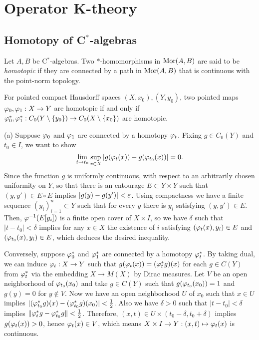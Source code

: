 \documentclass{../../large}
\begin{document}
\chapter{Operator K-theory}


\section{Homotopy of C$^*$-algebras}

\begin{prb}
Let $A,B$ be C$^*$-algebras.
Two $*$-homomorphisms in $\operatorname{Mor}(A,B)$ are said to be \emph{homotopic} if they are connected by a path in $\operatorname{Mor}(A,B)$ that is continuous with the point-norm topology.
\begin{parts}
\item For pointed compact Hausdorff spaces $(X,x_0),(Y,y_0)$, two pointed maps $\varphi_0,\varphi_1:X\to Y$ are homotopic if and only if $\varphi_0^*,\varphi_1^*:C_0(Y\setminus\{y_0\})\to C_0(X\setminus\{x_0\})$ are homotopic.
\end{parts}
\end{prb}
\begin{pf}
(a)
Suppose $\varphi_0$ and $\varphi_1$ are connected by a homotopy $\varphi_t$.
Fixing $g\in C_0(Y)$ and $t_0\in I$, we want to show
\[\lim_{t\to t_0}\sup_{x\in X}|g(\varphi_t(x))-g(\varphi_{t_0}(x))|=0.\]
Since the function $g$ is uniformly continuous, with respect to an arbitrarily chosen uniformity on $Y$, so that there is an entourage $E\subset Y\times Y$ such that $(y,y')\in E\circ E$ implies $|g(y)-g(y')|<\varepsilon$.
Using compactness we have a finite sequence $(y_i)_{i=1}^n\subset Y$ such that for every $y$ there is $y_i$ satisfying $(y,y')\in E$.
Then, $\varphi^{-1}(E[y_i])$ is a finite open cover of $X\times I$, so we have $\delta$ such that $|t-t_0|<\delta$ implies for any $x\in X$ the existence of $i$ satisfying $(\varphi_t(x),y_i)\in E$ and $(\varphi_{t_0}(x),y_i)\in E$, which deduces the desired inequality.

Conversely, suppose $\varphi_0^*$ and $\varphi_1^*$ are connected by a homotopy $\varphi_t^*$.
By taking dual, we can induce $\varphi_t:X\to Y$ such that $g(\varphi_t(x))=(\varphi_t^*g)(x)$ for each $g\in C(Y)$ from $\varphi_t^*$ via the embedding $X\to M(X)$ by Dirac measures.
Let $V$ be an open neighborhood of $\varphi_{t_0}(x_0)$ and take $g\in C(Y)$ such that $g(\varphi_{t_0}(x_0))=1$ and $g(y)=0$ for $y\notin V$.
Now we have an open neighborhood $U$ of $x_0$ such that $x\in U$ implies $|(\varphi_{t_0}^*g)(x)-(\varphi_{t_0}^*g)(x_0)|<\frac12$.
Also we have $\delta>0$ such that $|t-t_0|<\delta$ implies $\|\varphi_t^*g-\varphi_{t_0}^*g\|<\frac12$.
Therefore, $(x,t)\in U\times(t_0-\delta,t_0+\delta)$ implies $g(\varphi_t(x))>0$, hence $\varphi_t(x)\in V$, which means $X\times I\to Y:(x,t)\mapsto\varphi_t(x)$ is continuous.
\end{pf}
\end{document}
